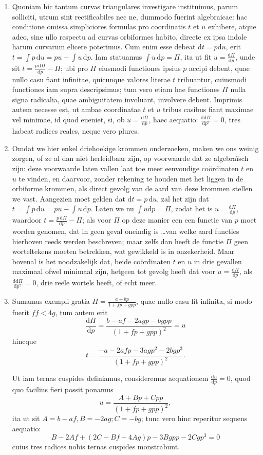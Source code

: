 \documentclass[10pt,a4paper]{article}
\newcommand{\switchenum}{\setcounter{enumi}{\arabic{enumi}-1}\switchcolumn}
\def\D{\mathrm{d}}
\begin{document}
\begin{paracol}{2}
\begin{enumerate}[topsep=1px]
		\item Quoniam hic tantum curvas triangulares investigare instituimus, parum solliciti, utrum sint rectificabiles nec ne, dummodo fuerint algebraicae: hac conditione omissa simpliciores formulas pro coordinatis $t$ et $u$ exhibere, atque adeo, sine ullo respectu ad curvas orbiformes habito, directe ex ipsa indole harum curvarum elicere poterimus. Cum enim esse debeat $\D t=p \D u$, erit $t=\int p\,\D u = pu-\int u \,\D p$. Iam statuamus $\int u \,\D p = \Pi$, ita ut fit $u=\frac{\D \Pi}{\D p}$, unde sit $t=\frac{p\,\D \Pi}{\D p}-\Pi$; ubi pro $\Pi$ eiusmodi functiones ipsius $p$ accipi debent, quae nullo casu fiant infinitae, quicunque valores literae $t$ tribuantur, cuiusmodi functiones iam supra descripsimus; tum vero etiam hae functiones $\Pi$ nulla signa radicalia, quae ambiguitatem involuant, involvere debent. Imprimis autem necesse est, ut ambae coordinatae $t$ et $u$ tribus casibus fiant maximae vel minimae, id quod eueniet, si, ob $u=\frac{\D \Pi}{\D p}$, haec aequatio: $\frac{\D\D \Pi}{\D p^2} = 0$, tres habeat radices reales, neque vero plures.

		\switchenum
		\item Omdat we hier enkel driehoekige krommen onderzoeken, maken we ons weinig zorgen, of ze al dan niet herleidbaar zijn, op voorwaarde dat ze algebraïsch zijn: deze voorwaarde laten vallen laat toe meer eenvoudige coördinaten $t$ en $u$ te vinden, en daarvoor, zonder rekening te houden met het liggen in de orbiforme krommen, als direct gevolg van de aard van deze krommen stellen we vast. Aangezien moet gelden dat $\D t = p\, \D u$, zal het zijn dat $t=\int p \, \D u= pu-\int u \, \D p$. Laten we nu $\int u \D p = \Pi$, zodat het is $u = \frac{\D \Pi}{\D p}$, waardoor $t=\frac{p\,\D \Pi}{\D p}-\Pi$; als voor $\Pi$ op deze manier een een functie van $p$ moet worden genomen, dat in geen geval oneindig is \ldots van welke aard functies hierboven reeds werden beschreven; maar zelfs dan heeft de functie $\Pi$ geen worteltekens moeten betrekken, wat gewikkeld is in onzekerheid. Maar bovenal is het noodzakelijk dat, beide coördinaten $t$ en $u$ in drie gevallen maximaal ofwel minimaal zijn, hetgeen tot gevolg heeft dat voor $u=\frac{\D \Pi }{\D p}$, als $\frac{\D \D \Pi}{\D p^2}=0$, drie reële wortels heeft, of echt meer.
		\switchcolumn*
		
		\item Sumamus exempli gratia $\Pi = \frac{a+bp}{1+fp+gpp}$, quae nullo casu fit infinita, si modo fuerit $ff< 4g$, tum autem erit
		\[
			\frac{\D \Pi}{\D p} = \frac{b-af-2agp-bgpp}{(1+fp+gpp)^2} = u
		\]
		hincque
		\[
			t = \frac{-a-2afp-3agp^2-2bgp^3}{(1+fp+gpp)^2}.
		\]
		\par Ut iam ternas cuspides definiamus, consideremus aequationem $\frac{\D u}{\D p} = 0$, quod quo facilius fieri possit ponamus
		\[
			u  =  \frac{A+Bp+Cpp}{(1+fp+gpp)^2},
		\]
		ita ut sit $A=b-af, B=-2ag; C=-bg$; tunc vero hinc reperitur sequens aequatio:
		\[
			B-2Af+(2C-Bf-4Ag)p-3Bgpp-2Cgp^3 = 0
		\]
		cuius tres radices nobis ternas cuspides monstrabunt.
		

\end{enumerate}
\end{paracol}
\end{document}
